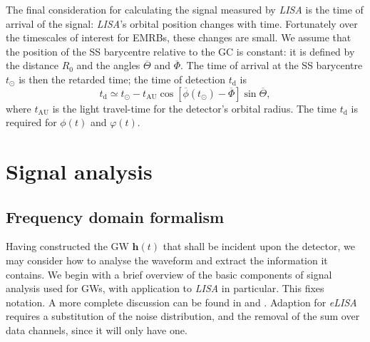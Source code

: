 \documentclass[useAMS,usedcolumn,usegraphicx,usenatbib]{mn2e}
\newcommand{\sub}[1]{\ensuremath{_\mathrm{#1}}}
\begin{document}
The final consideration for calculating the signal measured by \textit{LISA} is the time of arrival of the signal: \textit{LISA}'s orbital position changes with time. Fortunately over the timescales of interest for EMRBs, these changes are small. We assume that the position of the SS barycentre relative to the GC is constant: it is defined by the distance $R_0$ and the angles $\overline{\Theta}$ and $\overline{\Phi}$. The time of arrival at the SS barycentre $t_\odot$ is then the retarded time; the time of detection $t\sub{d}$ is
\begin{equation}
t\sub{d} \simeq t_\odot - t\sub{AU}\cos\left[\overline{\phi}(t_\odot) - \overline{\Phi}\right]\sin\overline{\Theta},
\end{equation}
where $t\sub{AU}$ is the light travel-time for the detector's orbital radius. The time $t\sub{d}$ is required for $\phi(t)$ and $\varphi(t)$.

\section{Signal analysis}\label{sec:Signal}

\subsection{Frequency domain formalism}

Having constructed the GW $\boldsymbol{h}(t)$ that shall be incident upon the detector, we may consider how to analyse the waveform and extract the information it contains. We begin with a brief overview of the basic components of signal analysis used for GWs, with application to \textit{LISA} in particular. This fixes notation. A more complete discussion can be found in \citet{Finn1992} and \citet{Cutler1994}. Adaption for \textit{eLISA} requires a substitution of the noise distribution, and the removal of the sum over data channels, since it will only have one.
\end{document}

